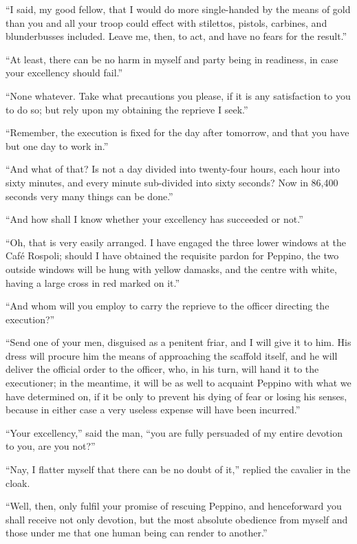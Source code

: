 “I said, my good fellow, that I would do more single-handed by the
means of gold than you and all your troop could effect with stilettos,
pistols, carbines, and blunderbusses included. Leave me, then, to act,
and have no fears for the result.”

“At least, there can be no harm in myself and party being in readiness,
in case your excellency should fail.”

“None whatever. Take what precautions you please, if it is any
satisfaction to you to do so; but rely upon my obtaining the reprieve I
seek.”

“Remember, the execution is fixed for the day after tomorrow, and that
you have but one day to work in.”

“And what of that? Is not a day divided into twenty-four hours, each
hour into sixty minutes, and every minute sub-divided into sixty
seconds? Now in 86,400 seconds very many things can be done.”

“And how shall I know whether your excellency has succeeded or not.”

“Oh, that is very easily arranged. I have engaged the three lower
windows at the Café Rospoli; should I have obtained the requisite
pardon for Peppino, the two outside windows will be hung with yellow
damasks, and the centre with white, having a large cross in red marked
on it.”

“And whom will you employ to carry the reprieve to the officer
directing the execution?”

“Send one of your men, disguised as a penitent friar, and I will give
it to him. His dress will procure him the means of approaching the
scaffold itself, and he will deliver the official order to the officer,
who, in his turn, will hand it to the executioner; in the meantime, it
will be as well to acquaint Peppino with what we have determined on, if
it be only to prevent his dying of fear or losing his senses, because
in either case a very useless expense will have been incurred.”

“Your excellency,” said the man, “you are fully persuaded of my entire
devotion to you, are you not?”

“Nay, I flatter myself that there can be no doubt of it,” replied the
cavalier in the cloak.

“Well, then, only fulfil your promise of rescuing Peppino, and
henceforward you shall receive not only devotion, but the most absolute
obedience from myself and those under me that one human being can
render to another.”

